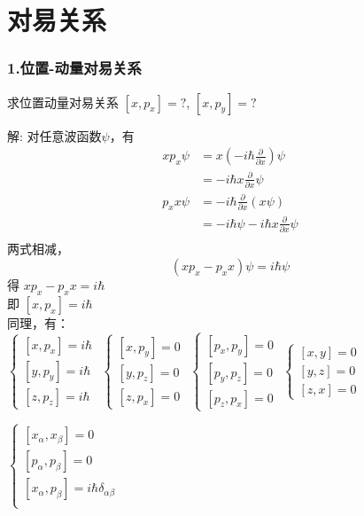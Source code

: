 \section{对易关系}
\begin{frame} [allowframebreaks=]
    \frametitle{1.位置-动量对易关系}
    \begin{exampleblock}{}
     求位置动量对易关系 $[x,p_x]=?$,  $[x,p_y]=?$
    \end{exampleblock}
    \alert{解:} 对任意波函数$\psi$，有
    \begin{equation*}
        \begin{split}
        xp_x\psi&= x(-i\hbar \frac{\partial}{\partial x})\psi \\
        &=-i\hbar x \frac{\partial}{\partial x}\psi\\
        p_x x \psi&= -i\hbar \frac{\partial}{\partial x} (x\psi) \\
        &=-i\hbar\psi - i\hbar x \frac{\partial}{\partial x}\psi \\
        \end{split}  
    \end{equation*}
    两式相减，$$(xp_x-p_x x)\psi= i\hbar\psi$$
    得 $xp_x-p_x x= i\hbar$ \\
    即 $[x,p_x]= i\hbar$\\
    同理，有：\\
    $\begin{cases}
        [x,p_x]= i\hbar  \\ 
        [y,p_y]= i\hbar  \\ 
        [z,p_z]= i\hbar  
    \end{cases}$
    $\begin{cases}
        [x,p_y]= 0  \\ 
        [y,p_z]= 0  \\ 
        [z,p_x]= 0  
    \end{cases}$
    $\begin{cases}
        [p_x,p_y]= 0  \\ 
        [p_y,p_z]= 0  \\ 
        [p_z,p_x]= 0  
    \end{cases}$
    $\begin{cases}
        [x,y]= 0  \\ 
        [y,z]= 0  \\ 
        [z,x]= 0  
    \end{cases}$ \\
    \begin{tcolorbox}[colback=yellow!5,colframe=red!75!black,title=量子力学基本对易关系]
    $\begin{cases}
        [x_\alpha,x_\beta]= 0  \\ 
        [p_\alpha,p_\beta]= 0  \\ 
        [x_\alpha,p_\beta]= i\hbar \delta_{\alpha\beta}  \\ 
    \end{cases}$
    \end{tcolorbox}
\end{frame} 

